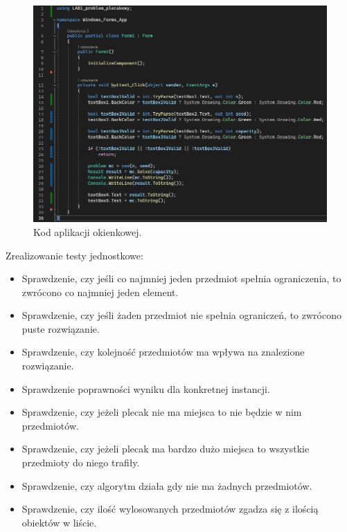 \documentclass{report}
\begin{document}
\begin{figure}[H]%
	\centering
	\includegraphics[scale=0.6]{zdj/form_code}
	\caption{Kod aplikacji okienkowej.}
\end{figure}

Zrealizowanie testy jednostkowe:

\begin{itemize}
	\item Sprawdzenie, czy jeśli co najmniej jeden przedmiot spełnia ograniczenia, to zwrócono co najmniej jeden element.
	\item Sprawdzenie, czy jeśli żaden przedmiot nie spełnia ograniczeń, to zwrócono puste rozwiązanie.
	\item Sprawdzenie, czy kolejność przedmiotów ma wpływa na znalezione rozwiązanie.
	\item Sprawdzenie poprawności wyniku dla konkretnej instancji.
	\item Sprawdzenie, czy jeżeli plecak nie ma miejsca to nie będzie w nim przedmiotów.
	\item Sprawdzenie, czy jeżeli plecak ma bardzo dużo miejsca to wszystkie przedmioty do niego trafiły.
	\item Sprawdzenie, czy algorytm działa gdy nie ma żadnych przedmiotów.
	\item Sprawdzenie, czy ilość wylosowanych przedmiotów zgadza się z ilością obiektów w liście.
\end{itemize}
\end{document}

